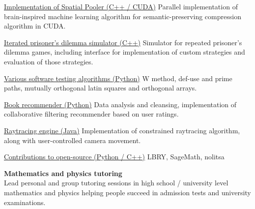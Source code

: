 \documentclass[9pt]{developercv} %
\begin{document}
\begin{entrylist}
	\entry
		{}
		{\href{https://github.com/mirgee/sp_cuda}{Implementation of Spatial Pooler (C++ / CUDA)}}
		{}
		{Parallel implementation of brain-inspired machine learning algorithm for semantic-preserving compression algorithm in CUDA.
        }

	\entry
		{}
		{\href{https://github.com/mirgee/iterated_prisoner-s_dilemma}{Iterated prisoner's dilemma simulator (C++)}}
		{}
		{Simulator for repeated prisoner's dilemma games, including interface for implementation of custom strategies and evaluation of those strategies.
        }

	\entry
		{}
		{\href{https://github.com/mirgee/w_method}{Various software testing algorithms (Python)}}
		{}
		{W method, def-use and prime paths, mutually orthogonal latin squares and orthogonal arrays.
        }

	\entry
		{}
		{\href{https://github.com/mirgee/book_recommender}{Book recommender (Python)}}
		{}
		{Data analysis and cleansing, implementation of collaborative filtering recommender based on user ratings.
        }

	\entry
		{}
		{\href{https://github.com/mirgee/raytracing_engine}{Raytracing engine (Java)}}
		{}
		{Implementation of constrained raytracing algorithm, along with user-controlled camera movement.
        }

	\entry
		{}
		{\href{}{Contributions to open-source (Python / C++)}}
		{}
		{LBRY, SageMath, nolitsa
        }
\end{entrylist}



\textbf{Mathematics and physics tutoring}\\Lead personal and group tutoring sessions in high school / university level mathematics and physics helping people succeed in admission tests and university examinations.
\end{document}
